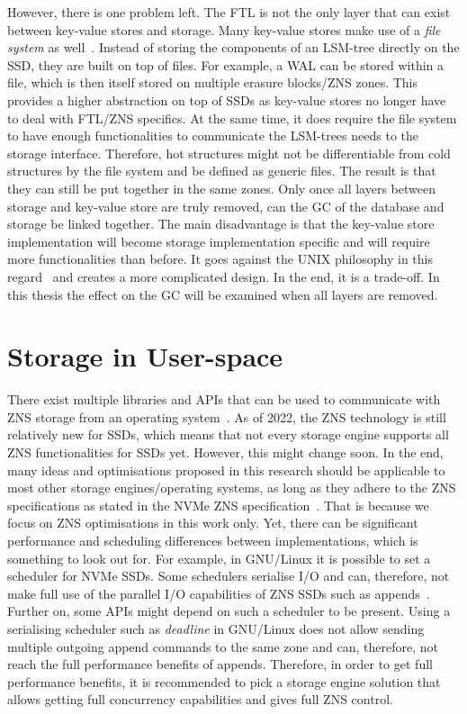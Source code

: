 However, there is one problem left. The FTL is not the only layer that can exist between key-value stores and storage. Many key-value stores make use of a \textit{file system} as well~\cite{cao2020characterizing, LevelDB}. Instead of storing the components of an LSM-tree directly on the SSD, they are built on top of files. For example, a WAL can be stored within a file, which is then itself stored on multiple erasure blocks/ZNS zones. This provides a higher abstraction on top of SSDs as key-value stores no longer have to deal with FTL/ZNS specifics. At the same time, it does require the file system to have enough functionalities to communicate the LSM-trees needs to the storage interface. Therefore, hot structures might not be differentiable from cold structures by the file system and be defined as generic files. The result is that they can still be put together in the same zones. Only once all layers between storage and key-value store are truly removed, can the GC of the database and storage be linked together. The main disadvantage is that the key-value store implementation will become storage implementation specific and will require more functionalities than before. It goes against the UNIX philosophy in this regard~\cite{gancarz2003linux} and creates a more complicated design. In the end, it is a trade-off. In this thesis the effect on the GC will be examined when all layers are removed.  

\section{Storage in User-space}
There exist multiple libraries and APIs that can be used to communicate with ZNS storage from an operating system~\cite{yang2017spdk, spdk, tehrany2022understanding, zonedstorage}. As of 2022, the ZNS technology is still relatively new for SSDs, which means that not every storage engine supports all ZNS functionalities for SSDs yet. However, this might change soon. In the end, many ideas and optimisations proposed in this research should be applicable to most other storage engines/operating systems, as long as they adhere to the ZNS specifications as stated in the NVMe ZNS specification~\cite{NVMeSpec}. That is because we focus on ZNS optimisations in this work only. Yet, there can be significant performance and scheduling differences between implementations, which is something to look out for. For example, in GNU/Linux it is possible to set a scheduler for NVMe SSDs. Some schedulers serialise I/O and can, therefore, not make full use of the parallel I/O capabilities of ZNS SSDs such as appends~\cite{tehrany2022understanding}. Further on, some APIs might depend on such a scheduler to be present. Using a serialising scheduler such as \textit{deadline} in GNU/Linux does not allow sending multiple outgoing append commands to the same zone and can, therefore, not reach the full performance benefits of appends. Therefore, in order to get full performance benefits, it is recommended to pick a storage engine solution that allows getting full concurrency capabilities and gives full ZNS control.


